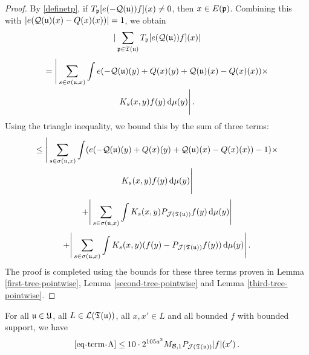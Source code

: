 {\begin{proof}
    By \eqref{definetp}, if $T_{{\mathfrak p}}[ e(-{\mathcal{Q}}({\mathfrak u}))f](x) \ne 0$, then $x \in E({\mathfrak p})$. Combining this with $|e({\mathcal{Q}}({\mathfrak u})(x)-{Q}(x)(x))| = 1$, we obtain
    $$
        |\sum_{{\mathfrak p} \in {\mathfrak T}({\mathfrak u})} T_{{\mathfrak p}}[ e({\mathcal{Q}}({\mathfrak u}))f](x)|
    $$
    \begin{multline*}
        = \Bigg| \sum_{s \in \sigma({\mathfrak u}, x)} \int e(-{\mathcal{Q}}({\mathfrak u})(y) + {Q}(x)(y) + {\mathcal{Q}}({\mathfrak u})(x) -{Q}(x)(x))\times\\
        K_s(x,y)f(y) \, \mathrm{d}\mu(y) \Bigg|\,.
    \end{multline*}
    Using the triangle inequality, we bound this by the sum of three terms:
    \begin{multline}
        \label{eq-term-A}
        \le \Bigg| \sum_{s \in \sigma({\mathfrak u}, x)} \int (e(-{\mathcal{Q}}({\mathfrak u})(y) + {Q}(x)(y) + {\mathcal{Q}}({\mathfrak u})(x) -{Q}(x)(x))-1)\times\\
        K_s(x,y)f(y) \, \mathrm{d}\mu(y) \Bigg|
    \end{multline}
    \begin{equation}
        \label{eq-term-B}
        + \Bigg| \sum_{s \in \sigma({\mathfrak u}, x)} \int K_s(x,y) P_{\mathcal{J}({\mathfrak T}({\mathfrak u}))} f(y) \, \mathrm{d}\mu(y) \Bigg|
    \end{equation}
    \begin{equation}
        \label{eq-term-C}
        + \Bigg| \sum_{s \in \sigma({\mathfrak u}, x)} \int K_s(x,y) (f(y) - P_{\mathcal{J}({\mathfrak T}({\mathfrak u}))} f(y)) \, \mathrm{d}\mu(y) \Bigg|\,.
    \end{equation}
    The proof is completed using the bounds for these three terms proven in Lemma \ref{first-tree-pointwise}, Lemma \ref{second-tree-pointwise} and Lemma \ref{third-tree-pointwise}.
\end{proof}

\begin{lemma}
    \label{first-tree-pointwise}
    For all ${\mathfrak u} \in {\mathfrak U}$, all $L \in \mathcal{L}({\mathfrak T}({\mathfrak u}))$, all $x, x' \in L$ and all bounded $f$ with bounded support, we have
    $$
        \eqref{eq-term-A} \le 10 \cdot 2^{105a^3} M_{\mathcal{B}, 1}P_{\mathcal{J}({\mathfrak T}({\mathfrak u}))}|f|(x')\,.
    $$
\end{lemma}

}
